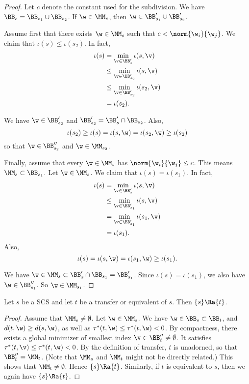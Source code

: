 \begin{proof}
Let $c$ denote the constant used for the subdivision.
We have $\BB_s =
\BB_{s_1}\cup \BB_{s_2}$.  If $\w\in \MM_s$, then
$\w\in \BB'_{s_1}\cup\BB'_{s_2}$.

Assume first that there exists $\w\in \MM_s$ such that $c < \norm{\w_i}{\w_j}$.
We claim that $\iota(s) \le \iota(s_2)$.  In fact,
\begin{align*}
\iota(s) &=\min_{\v\in \BB'_s} \iota(s,\v)\\
&\le \min_{\v\in \BB'_{s_2}} \iota(s,\v) \\
&\le \min_{\v\in \BB'_{s_2}} \iota(s_2,\v) \\
&=\iota(s_2).
\end{align*}

We have $\w\in\BB'_{s_2}$ and $\BB'_{s_2} = \BB'_s \cap \BB_{s_2}$.
Also,
\[
\iota(s_2)\ge \iota(s) = \iota(s,\w) = \iota(s_2,\w) \ge \iota(s_2)
\]
so that $\w\in \BB''_{s_2}$ and $\w\in \MM_{s_2}$.

Finally, assume that every $\w\in\MM_s$ has $\norm{\w_i}{\w_j}\le c$.  This
means $\MM_s\subset \BB_{s_1}$. Let $\w\in\MM_s$.
We claim that $\iota(s) = \iota(s_1)$.  In fact,
\begin{align*}
\iota(s) &= \min_{\v\in \BB'_s} \iota(s,\v) \\
   &\le \min_{\v\in\BB'_{s_1}}\iota(s,\v)\\
   &=\min_{\v\in \BB'_{s_1}}\iota(s_1,\v)\\
   &=\iota(s_1).
\end{align*}
Also, 
\[
\iota(s) = \iota(s,\w) = \iota(s_1,\w) \ge \iota(s_1).
\]

We have $\w\in\MM_s\subset \BB'_s\cap \BB_{s_1} = \BB'_{s_1}$.
Since $\iota(s)=\iota(s_1)$, we also have $\w\in \BB''_{s_1}$.
So $\w\in \MM_{s_1}$.
\end{proof}

\begin{lemma}  
Let $s$ be a SCS and let
 $t$ be a transfer or equivalent of $s$.  
Then  $\{s\}\Ra\{t\}$.
\end{lemma}

\begin{proof}
Assume that $\MM_s\ne\emptyset$.
Let $\w\in \MM_s$.
We have $\w\in \BB_s\subset\BB_t$, and $d(t,\w) \ge d(s,\w)$,
as well as $\tau^*(t,\w)\le\tau^*(t,\w)< 0$.   By compactness, there
exists a global minimizer of smallest index
$\v\in\BB''_t\ne\emptyset$.  It satisfies
$\tau^*(t,\v)\le\tau^*(t,\w)< 0$.  By the definition of transfer,
$t$
is unadorned, so that $\BB''_t=\MM_t$.  (Note that $\MM_s$ and
$\MM_t$
might not be directly related.)  This shows that
$\MM_t\ne\emptyset$.
Hence $\{s\}\Ra\{t\}$.  Similarly, if $t$ is equivalent to $s$,
then we again have $\{s\}\Ra\{t\}$.
\end{proof}

